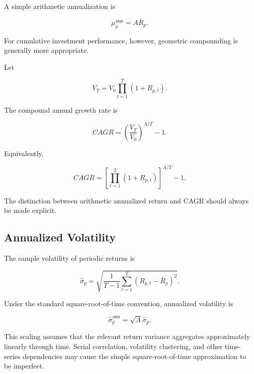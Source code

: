 \documentclass[11pt,a4paper]{article}
\begin{document}
A simple arithmetic annualization is

\begin{equation}
\boxed{
\mu_p^{\mathrm{ann}}
=
A\bar{R}_p.
}
\end{equation}

For cumulative investment performance, however, geometric compounding is
generally more appropriate.

Let

\begin{equation}
V_T
=
V_0
\prod_{t=1}^{T}
(1+R_{p,t}).
\end{equation}

The compound annual growth rate is

\begin{equation}
\boxed{
CAGR
=
\left(
\frac{V_T}{V_0}
\right)^{A/T}
-1.
}
\end{equation}

Equivalently,

\begin{equation}
\boxed{
CAGR
=
\left[
\prod_{t=1}^{T}
(1+R_{p,t})
\right]^{A/T}
-1.
}
\end{equation}

The distinction between arithmetic annualized return and CAGR should always be
made explicit.


\subsection{Annualized Volatility}

The sample volatility of periodic returns is

\begin{equation}
\widehat{\sigma}_p
=
\sqrt{
\frac{1}{T-1}
\sum_{t=1}^{T}
\left(
R_{p,t}-\bar{R}_p
\right)^2
}.
\end{equation}

Under the standard square-root-of-time convention, annualized volatility is

\begin{equation}
\boxed{
\widehat{\sigma}_p^{\mathrm{ann}}
=
\sqrt{A}
\widehat{\sigma}_p.
}
\end{equation}

This scaling assumes that the relevant return variance aggregates approximately
linearly through time. Serial correlation, volatility clustering, and other
time-series dependencies may cause the simple square-root-of-time approximation
to be imperfect.
\end{document}

